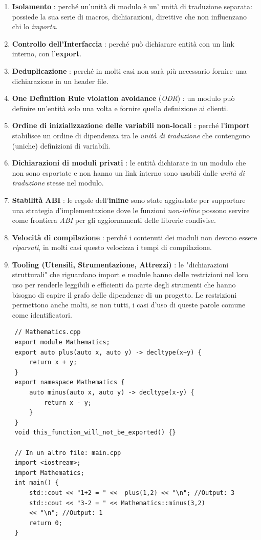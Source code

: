 \begin{enumerate}
	\item \textsf{\small \textbf{Isolamento} : perché un'unità di modulo è un' unità di traduzione separata: possiede la sua serie di macros, dichiarazioni, direttive che non influenzano chi lo \emph{importa}.}
	\item \textsf{\small \textbf{Controllo dell'Interfaccia} : perché può dichiarare entità con un link interno, con l'\textbf{export}.}
	\item \textsf{\small \textbf{Deduplicazione} : perché in molti casi non sarà più necessario fornire una dichiarazione in un header file.}
	\item \textsf{\small \textbf{One Definition Rule violation avoidance} (\emph{ODR}) : un modulo può definire un'entità solo una volta e fornire quella definizione ai clienti.}
	\item \textsf{\small \textbf{Ordine di inizializzazione delle variabili non-locali} : perché l'\textbf{import} stabilisce un ordine di dipendenza tra le \emph{unità di traduzione} che contengono (uniche) definizioni di variabili.}
	\item \textsf{\small \textbf{Dichiarazioni di moduli privati} : le entità dichiarate in un modulo che non sono esportate e non hanno un link interno sono usabili dalle \emph{unità di traduzione} stesse nel modulo.}
	\item \textsf{\small \textbf{Stabilità ABI} : le regole dell'\textbf{inline} sono state aggiustate per supportare una strategia d'implementazione dove le funzioni \emph{non-inline} possono servire come frontiera \emph{ABI} per gli aggiornamenti delle librerie condivise.}
	\item \textsf{\small \textbf{Velocità di compilazione} : perché i contenuti dei moduli non devono essere \emph{riparsati}, in molti casi questo velocizza i tempi di compilazione.}
	\item \textsf{\small \textbf{Tooling (Utensili, Strumentazione, Attrezzi)} :  le "dichiarazioni strutturali" che riguardano import e module hanno delle restrizioni nel loro uso per renderle leggibili e efficienti da parte degli strumenti che hanno bisogno di capire il grafo delle dipendenze di un progetto. Le restrizioni permettono anche molti, se non tutti, i casi d'uso di queste parole comune come identificatori.}
\end{enumerate}

\begin{lstlisting}
	// Mathematics.cpp
	export module Mathematics;
	export auto plus(auto x, auto y) -> decltype(x+y) {
		return x + y;
	}
	export namespace Mathematics {
		auto minus(auto x, auto y) -> decltype(x-y) {
			return x - y;  
		}   
	}
	void this_function_will_not_be_exported() {}
	
	// In un altro file: main.cpp
	import <iostream>;
	import Mathematics;
	int main() {
		std::cout << "1+2 = " <<  plus(1,2) << "\n"; //Output: 3
		std::cout << "3-2 = " << Mathematics::minus(3,2) 
		<< "\n"; //Output: 1
		return 0;
	}
\end{lstlisting}

